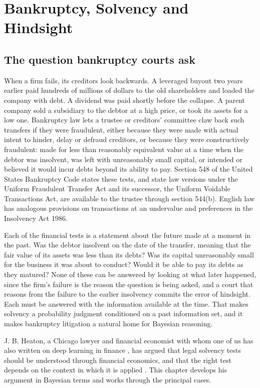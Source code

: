 \chapter{Bankruptcy, Solvency and Hindsight}
\label{ch:bankruptcy}

\section{The question bankruptcy courts ask}

When a firm fails, its creditors look backwards. A leveraged buyout two years earlier paid hundreds of millions of dollars to the old shareholders and loaded the company with debt. A dividend was paid shortly before the collapse. A parent company sold a subsidiary to the debtor at a high price, or took its assets for a low one. Bankruptcy law lets a trustee or creditors' committee claw back such transfers if they were fraudulent, either because they were made with actual intent to hinder, delay or defraud creditors, or because they were constructively fraudulent: made for less than reasonably equivalent value at a time when the debtor was insolvent, was left with unreasonably small capital, or intended or believed it would incur debts beyond its ability to pay. Section 548 of the United States Bankruptcy Code states these tests, and state law versions under the Uniform Fraudulent Transfer Act and its successor, the Uniform Voidable Transactions Act, are available to the trustee through section 544(b). English law has analogous provisions on transactions at an undervalue and preferences in the Insolvency Act 1986.

Each of the financial tests is a statement about the future made at a moment in the past. Was the debtor insolvent on the date of the transfer, meaning that the fair value of its assets was less than its debts? Was its capital unreasonably small for the business it was about to conduct? Would it be able to pay its debts as they matured? None of these can be answered by looking at what later happened, since the firm's failure is the reason the question is being asked, and a court that reasons from the failure to the earlier insolvency commits the error of hindsight. Each must be answered with the information available at the time. That makes solvency a probability judgment conditioned on a past information set, and it makes bankruptcy litigation a natural home for Bayesian reasoning.

J. B. Heaton, a Chicago lawyer and financial economist with whom one of us has also written on deep learning in finance \citep{heaton2017}, has argued that legal solvency tests should be understood through financial economics, and that the right test depends on the context in which it is applied \citep{heaton2002,heaton2007}. This chapter develops his argument in Bayesian terms and works through the principal cases.

